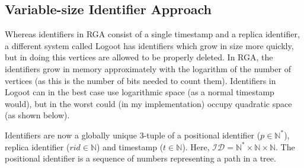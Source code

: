 \documentclass[diss.tex]{subfiles}
\begin{document}
\subsection{Variable-size Identifier Approach}
Whereas identifiers in RGA consist of a single timestamp and a replica identifier, a different system called Logoot \cite{logoot} has identifiers which grow in size more quickly, but in doing this vertices are allowed to be properly deleted. In RGA, the identifiers grow in memory approximately with the logarithm of the number of vertices (as this is the number of bits needed to count them). Identifiers in Logoot can in the best case use logarithmic space (as a normal timestamp would), but in the worst could (in my implementation) occupy quadratic space (as shown below).

Identifiers are now a globally unique 3-tuple of a positional identifier ($p \in \mathbb{N^*}$), replica identifier ($rid \in \mathbb{N}$) and timestamp ($t \in \mathbb{N}$). Here, $\mathcal{ID} = \mathbb{N^*} \times \mathbb{N} \times \mathbb{N} $. The positional identifier is a sequence of numbers representing a path in a tree.
\end{document}
